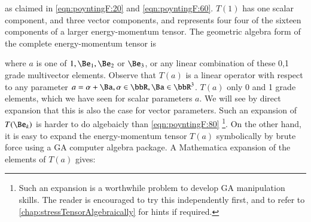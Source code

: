 as claimed in \cref{eqn:poyntingF:20} and \cref{eqn:poyntingF:60}.  \( T(1) \) has one scalar component, and three vector components, and represents four
four of the sixteen components of a larger energy-momentum tensor.  The geometric algebra form of the complete energy-momentum tensor is


where \( a \) is one of \( 1, \Be_1, \Be_2 \) or \( \Be_3 \), or any linear combination of these 0,1 grade multivector elements.  Observe that \( T(a) \) is a linear operator with respect to any parameter \( a = \alpha + \Ba, \alpha \in \bbR, \Ba \in \bbR^3 \).  \( T(a) \) only 0 and 1 grade elements, which we have seen for scalar parameters \( a \).  We will see by direct expansion that this is also the case for vector parameters.
Such an expansion of \( T(\Be_k) \) is harder to do algebaicly than \cref{eqn:poyntingF:80}
\footnote{Such an expansion is a worthwhile problem to develop GA manipulation skills.  The reader is encouraged to try this independently first, and to refer to
\cref{chap:stressTensorAlgebraically}
for hints if required.}.
On the other hand, it is easy to expand the energy-momentum tensor \( T(a) \) symbolically by brute force using a GA computer algebra package.
A Mathematica expansion of the elements of \( T(a) \) gives:

